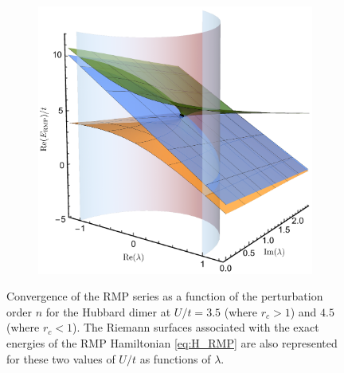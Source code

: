 \documentclass[aps,prb,reprint,noshowkeys,superscriptaddress]{revtex4-1}
\begin{document}
\begin{figure}
\begin{subfigure}{0.32\textwidth}
	\includegraphics[height=0.75\textwidth]{fig2c}	
    \end{subfigure}
	\caption{
	Convergence of the RMP series as a function of the perturbation order $n$ for the Hubbard dimer at $U/t = 3.5$ (where $r_c > 1$) and $4.5$ (where $r_c < 1$).
	The Riemann surfaces associated with the exact energies of the RMP Hamiltonian \eqref{eq:H_RMP} are also represented for these two values of $U/t$ as functions of $\lambda$. 
	\label{fig:RMP}}
\end{figure}
\end{document}
